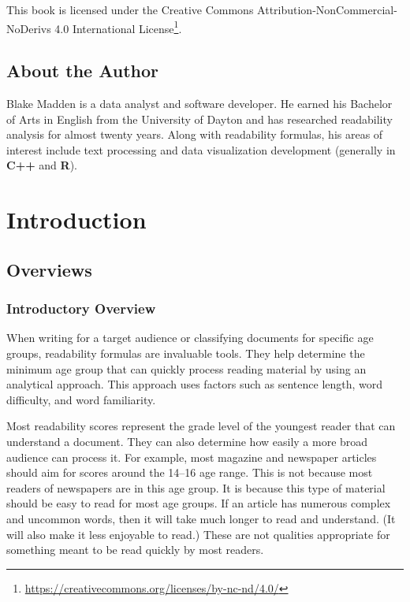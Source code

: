 \documentclass[
]{book}
\DeclareRobustCommand{\href}[2]{#2\footnote{\url{#1}}}
\theoremstyle{definition}
\theoremstyle{definition}
\theoremstyle{definition}
\theoremstyle{definition}
\theoremstyle{remark}
\begin{document}
This book is licensed under the \href{https://creativecommons.org/licenses/by-nc-nd/4.0/}{Creative Commons Attribution-NonCommercial-NoDerivs 4.0 International License}.

\hypertarget{about-the-author}{%
\chapter*{About the Author}\label{about-the-author}}

Blake Madden is a data analyst and software developer. He earned his Bachelor of Arts in English from the University of Dayton and has researched readability analysis for almost twenty years. Along with readability formulas, his areas of interest include text processing and data visualization development (generally in \textbf{C++} and \textbf{R}).

\hypertarget{part-introduction}{%
\part{Introduction}\label{part-introduction}}

\hypertarget{overviews}{%
\chapter{Overviews}\label{overviews}}

\hypertarget{intro}{%
\section{Introductory Overview}\label{intro}}

When writing for a target audience or classifying documents for specific age groups, readability formulas are invaluable tools. They help determine the minimum age group that can quickly process reading material by using an analytical approach. This approach uses factors such as sentence length, word difficulty, and word familiarity.

Most readability scores represent the grade level of the youngest reader that can understand a document. They can also determine how easily a more broad audience can process it. For example, most magazine and newspaper articles should aim for scores around the 14--16 age range. This is not because most readers of newspapers are in this age group. It is because this type of material should be easy to read for most age groups. If an article has numerous complex and uncommon words, then it will take much longer to read and understand. (It will also make it less enjoyable to read.) These are not qualities appropriate for something meant to be read quickly by most readers.
\end{document}
